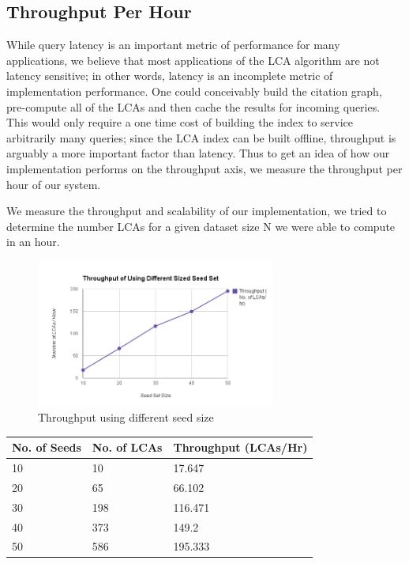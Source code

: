 \documentclass{article}
\begin{document}
\subsection{Throughput Per Hour}

While query latency is an important metric of performance for many applications, we believe that most applications of the LCA algorithm are not latency sensitive; in other words, latency is an incomplete metric of implementation performance.
One could conceivably build the citation graph, pre-compute all of the LCAs and then cache the results for incoming queries.
This would only require a one time cost of building the index to service arbitrarily many queries; since the LCA index can be built offline, throughput is arguably a more important factor than latency.
Thus to get an idea of how our implementation performs on the throughput axis, we measure the throughput per hour of our system.

We measure the throughput and scalability of our implementation, we tried to determine the number LCAs for a given dataset size N we were able to compute in an hour.

\begin{figure}
    \centering
    \includegraphics[width=0.7\textwidth]{throughput.png}
    \caption{Throughput using different seed size}
    \label{fig:throughput}
\end{figure}

\begin{table}[h]
    \begin{tabular}{|l|l|l|}
    \hline
    No. of Seeds  & No. of LCAs & Throughput (LCAs/Hr) \\ \hline
    10 & 10          & 17.647               \\ \hline
    20 & 65          & 66.102               \\ \hline
    30 & 198         & 116.471              \\ \hline
    40 & 373         & 149.2                \\ \hline
    50 & 586         & 195.333              \\ \hline
    \end{tabular}
\end{table}
\end{document}

